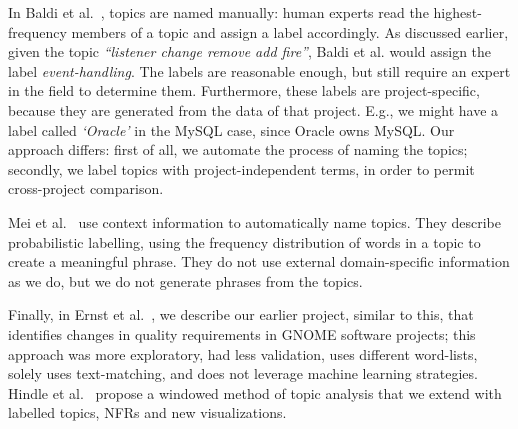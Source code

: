 \documentclass[smallextended]{svjour3}       %
\begin{document}
In Baldi et al.~\cite{Baldi2008}, topics are named manually: human
experts read the highest-frequency members of a topic and assign a
label accordingly. 
As discussed earlier, given the topic \emph{``listener change remove add fire''}, Baldi et al. would assign the label \emph{event-handling}. 
The labels are reasonable enough, but still require an expert in the field to determine them. 
Furthermore, these labels are project-specific, because they are generated from the data of that project. E.g., we might have a label called \emph{`Oracle'}
in the MySQL case, since Oracle owns MySQL. 
Our approach differs: first of all, we automate the process of naming the topics; secondly, we label topics with project-independent terms, in order
to permit cross-project comparison.

Mei et al.~\cite{Mei2007} use context information to automatically name topics. 
They describe probabilistic labelling, using the frequency distribution of words in a topic to create a meaningful phrase. 
They do not use external domain-specific information as we do, but we
do not generate phrases from the topics.

Finally, in Ernst et al.~\cite{ernst10refsq}, we describe our earlier
project, similar to this, that identifies changes in quality requirements
in GNOME software projects; this approach was more exploratory, had
less validation, uses different word-lists, solely uses text-matching,
and does not leverage machine learning strategies. 
Hindle et al.~\cite{Hindle09ICSM} propose a windowed method of topic
analysis that we extend with labelled
topics, NFRs and new visualizations.

\end{document}

